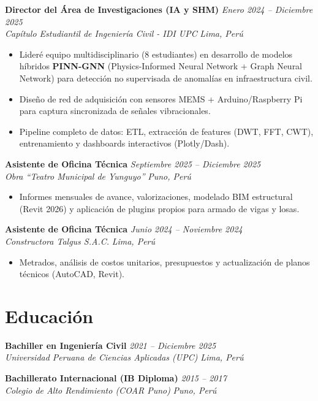 \documentclass[10pt, a4paper]{article}
\newcommand{\entry}[4]{
    \textbf{#1} \hfill \textit{#2} \\
    \textit{#3} \hfill \textit{#4} \\
    \vspace{-1.5mm}
}
\begin{document}
\vspace{1mm}

\entry{Director del Área de Investigaciones (IA y SHM)}{Enero 2024 -- Diciembre 2025}{Capítulo Estudiantil de Ingeniería Civil - IDI UPC}{Lima, Perú}
\begin{itemize}
    \item Lideré equipo multidisciplinario (8 estudiantes) en desarrollo de modelos híbridos \textbf{PINN-GNN} (Physics-Informed Neural Network + Graph Neural Network) para detección no supervisada de anomalías en infraestructura civil.
    \item Diseño de red de adquisición con sensores MEMS + Arduino/Raspberry Pi para captura sincronizada de señales vibracionales.
    \item Pipeline completo de datos: ETL, extracción de features (DWT, FFT, CWT), entrenamiento y dashboards interactivos (Plotly/Dash).
\end{itemize}

\vspace{1mm}

\entry{Asistente de Oficina Técnica}{Septiembre 2025 -- Diciembre 2025}{Obra ``Teatro Municipal de Yunguyo''}{Puno, Perú}
\begin{itemize}
    \item Informes mensuales de avance, valorizaciones, modelado BIM estructural (Revit 2026) y aplicación de plugins propios para armado de vigas y losas.
\end{itemize}

\vspace{1mm}

\entry{Asistente de Oficina Técnica}{Junio 2024 -- Noviembre 2024}{Constructora Talgus S.A.C.}{Lima, Perú}
\begin{itemize}
    \item Metrados, análisis de costos unitarios, presupuestos y actualización de planos técnicos (AutoCAD, Revit).
\end{itemize}

\section*{Educación}
\entry{Bachiller en Ingeniería Civil}{2021 -- Diciembre 2025}{Universidad Peruana de Ciencias Aplicadas (UPC)}{Lima, Perú}
\vspace{1mm}
\entry{Bachillerato Internacional (IB Diploma)}{2015 -- 2017}{Colegio de Alto Rendimiento (COAR Puno)}{Puno, Perú}
\end{document}
